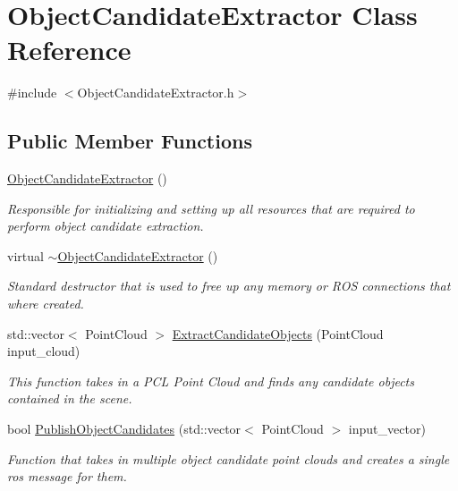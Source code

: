 \hypertarget{class_object_candidate_extractor}{\section{\-Object\-Candidate\-Extractor \-Class \-Reference}
\label{class_object_candidate_extractor}
}


{\ttfamily \#include $<$\-Object\-Candidate\-Extractor.\-h$>$}

\subsection*{\-Public \-Member \-Functions}
\begin{DoxyCompactItemize}
\item 
\hypertarget{class_object_candidate_extractor_a41916df0d27e926a337fff6e7e762010}{\hyperlink{class_object_candidate_extractor_a41916df0d27e926a337fff6e7e762010}{\-Object\-Candidate\-Extractor} ()}\label{class_object_candidate_extractor_a41916df0d27e926a337fff6e7e762010}

\begin{DoxyCompactList}\small\item\em \-Responsible for initializing and setting up all resources that are required to perform object candidate extraction. \end{DoxyCompactList}\item 
\hypertarget{class_object_candidate_extractor_ad1aa824172a7d2e6002d5d7e3104d5d3}{virtual \hyperlink{class_object_candidate_extractor_ad1aa824172a7d2e6002d5d7e3104d5d3}{$\sim$\-Object\-Candidate\-Extractor} ()}\label{class_object_candidate_extractor_ad1aa824172a7d2e6002d5d7e3104d5d3}

\begin{DoxyCompactList}\small\item\em \-Standard destructor that is used to free up any memory or \-R\-O\-S connections that where created. \end{DoxyCompactList}\item 
std\-::vector$<$ \-Point\-Cloud $>$ \hyperlink{class_object_candidate_extractor_a6a4adbcec19f94bc6073a4b2c2fa6f66}{\-Extract\-Candidate\-Objects} (\-Point\-Cloud input\-\_\-cloud)
\begin{DoxyCompactList}\small\item\em \-This function takes in a \-P\-C\-L \-Point \-Cloud and finds any candidate objects contained in the scene. \end{DoxyCompactList}\item 
bool \hyperlink{class_object_candidate_extractor_ab8848f6d86f7d7798ea30c2e04ae8b59}{\-Publish\-Object\-Candidates} (std\-::vector$<$ \-Point\-Cloud $>$ input\-\_\-vector)
\begin{DoxyCompactList}\small\item\em \-Function that takes in multiple object candidate point clouds and creates a single ros message for them. \end{DoxyCompactList}\end{DoxyCompactItemize}
